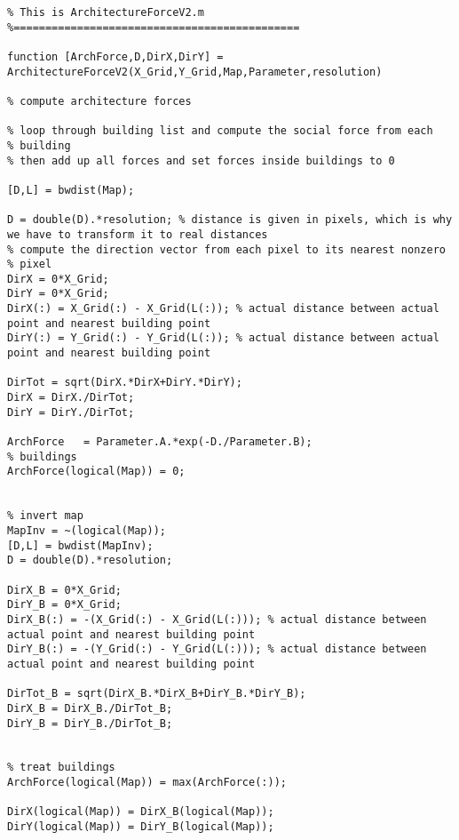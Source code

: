 \lstset{basicstyle=\footnotesize\ttfamily}
    
\begin{lstlisting}[breaklines]
%=============================================
% This is ArchitectureForceV2.m
%=============================================

function [ArchForce,D,DirX,DirY] = ArchitectureForceV2(X_Grid,Y_Grid,Map,Parameter,resolution)

% compute architecture forces

% loop through building list and compute the social force from each
% building
% then add up all forces and set forces inside buildings to 0

[D,L] = bwdist(Map);

D = double(D).*resolution; % distance is given in pixels, which is why we have to transform it to real distances
% compute the direction vector from each pixel to its nearest nonzero
% pixel
DirX = 0*X_Grid;
DirY = 0*X_Grid;
DirX(:) = X_Grid(:) - X_Grid(L(:)); % actual distance between actual point and nearest building point
DirY(:) = Y_Grid(:) - Y_Grid(L(:)); % actual distance between actual point and nearest building point

DirTot = sqrt(DirX.*DirX+DirY.*DirY);
DirX = DirX./DirTot;
DirY = DirY./DirTot;

ArchForce   = Parameter.A.*exp(-D./Parameter.B);
% buildings
ArchForce(logical(Map)) = 0;


% invert map
MapInv = ~(logical(Map));
[D,L] = bwdist(MapInv);
D = double(D).*resolution;

DirX_B = 0*X_Grid;
DirY_B = 0*X_Grid;
DirX_B(:) = -(X_Grid(:) - X_Grid(L(:))); % actual distance between actual point and nearest building point
DirY_B(:) = -(Y_Grid(:) - Y_Grid(L(:))); % actual distance between actual point and nearest building point

DirTot_B = sqrt(DirX_B.*DirX_B+DirY_B.*DirY_B);
DirX_B = DirX_B./DirTot_B;
DirY_B = DirY_B./DirTot_B;


% treat buildings
ArchForce(logical(Map)) = max(ArchForce(:));

DirX(logical(Map)) = DirX_B(logical(Map));
DirY(logical(Map)) = DirY_B(logical(Map));
\end{lstlisting}


